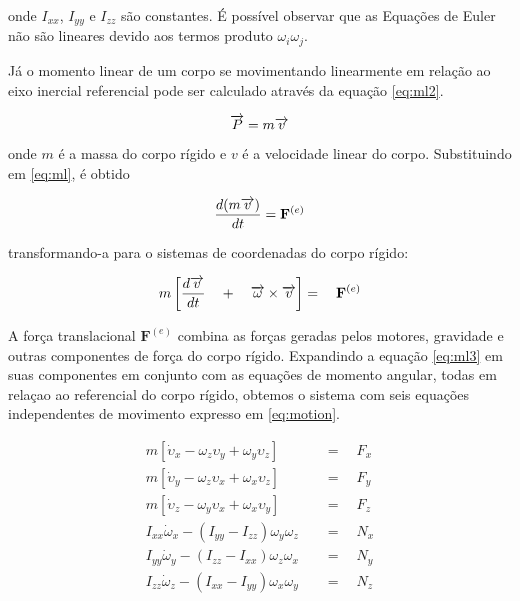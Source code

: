 \documentclass[a4paper, 12pt]{article}
\begin{document}
\noindent onde $I_{xx}$, $I_{yy}$ e $I_{zz}$ são constantes. É possível observar que as Equações de Euler não são lineares devido aos termos produto $\omega_i\omega_j$. 

Já o momento linear de um corpo se movimentando linearmente em relação ao eixo inercial referencial pode ser calculado através da equação \ref{eq:ml2}.

\begin{equation}
\centering
\overrightarrow { P } = m\overrightarrow { v } 
\label{eq:ml2}
\end{equation}

\noindent onde $m$ é a massa do corpo rígido e $v$ é a velocidade linear do corpo. Substituindo em \ref{eq:ml}, é obtido 

\begin{equation}
\centering
\frac { d(m\overrightarrow { v } ) }{ dt } ={ \mathbf{F} }^{ (e) }
\label{eq:ml3}
\end{equation}

\noindent  transformando-a para o sistemas de coordenadas do corpo rígido:

\begin{equation}
\centering
m\left[ \frac { d\overrightarrow { v }  }{ dt } \quad +\quad \overrightarrow { \omega  } \times \overrightarrow { v }  \right] =\quad { \mathbf{F} }^{ (e) }
\label{eq:ml3}
\end{equation}

\noindent A força translacional $\mathbf{F}^{(e)}$ combina as forças geradas pelos motores, gravidade e outras componentes de força do corpo rígido. Expandindo a equação \ref{eq:ml3} em suas componentes em conjunto com as equações de momento angular, todas em relaçao ao referencial do corpo rígido, obtemos o sistema com seis equações independentes de movimento expresso em \ref{eq:motion}.

\begin{equation}
\begin{aligned}
	m\left[ { \dot { \upsilon  }  }_{ x } - { \omega  }_{ z }\upsilon_{ y } + { \omega  }_{ y }{ \upsilon  }_{ z } \right] \quad &=\quad { F }_{ x } \\ 
	m\left[ { \dot { \upsilon  }  }_{ y } - { \omega  }_{ z }\upsilon_{ x } + { \omega  }_{ x }{ \upsilon  }_{ z } \right] \quad &=\quad { F }_{ y } \\
	m\left[ { \dot { \upsilon  }  }_{ z } - { \omega  }_{ y }\upsilon_{ x } + { \omega  }_{ x }{ \upsilon  }_{ y } \right] \quad &=\quad { F }_{ z } \\ 
	{ I }_{ xx }{ \dot { \omega  }  }_{ x } - (I_{ yy } - I_{ zz }){ \omega  }_{ y }{ \omega  }_{ z }\quad &=\quad N_{ x } \\
	{ I }_{ yy }{ \dot { \omega  }  }_{ y } - (I_{ zz } - I_{ xx }){ \omega  }_{ z }{ \omega  }_{ x }\quad &=\quad N_{ y }\\
	{ I }_{ zz }{ \dot { \omega  }  }_{ z } - (I_{ xx } - I_{ yy }){ \omega  }_{ x }{ \omega  }_{ y }\quad &=\quad N_{ z }
\end{aligned}
\label{eq:motion}
\end{equation}
\end{document}

